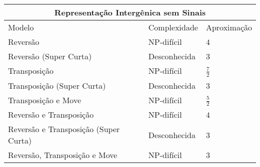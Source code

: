 \begin{table}[!htb]
  \begin{tabular}{|p{8cm}|p{3cm}|p{3cm}|}
    \hline
    \multicolumn{3}{|c|}{Representação Intergênica sem Sinais}                                                                                   \\ \hline
    Modelo                  & Complexidade                                 & Aproximação                                                         \\ \hline
    Reversão                                & NP-difícil~\cite{2020a-brito-etal}           & $4$~\cite{2020a-brito-etal}                         \\ \hline
    Reversão (Super Curta)                  & Desconhecida                                 & $3$~\cite{2019c-oliveira-etal}                      \\ \hline
    Transposição                            & NP-difícil~\cite{2021a-oliveira-etal}        & $\frac{7}{2}$~\cite{2021a-oliveira-etal}            \\ \hline
    Transposição (Super Curta)              & Desconhecida                                 & $3$~\cite{2019c-oliveira-etal}                      \\ \hline
    Transposição e Move                     & NP-difícil~\cite{2021a-oliveira-etal}        & $\frac{5}{2}$~\cite{2021a-oliveira-etal}            \\ \hline
    Reversão e Transposição                 & NP-difícil~\cite{2020a-brito-etal}           & $4$~\cite{2021b-brito-etal}                         \\ \hline
    Reversão e Transposição (Super Curta)   & Desconhecida                                 & $3$~\cite{2019c-oliveira-etal}                      \\ \hline
    Reversão, Transposição e Move           & NP-difícil~\cite{2021b-brito-etal}           & $3$~\cite{2021b-brito-etal}                         \\ \hline
  \end{tabular}
\end{table}